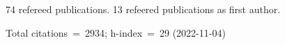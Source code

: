 74 refereed publications. 13 refeered publications as first author.

Total citations~=~2934; h-index~=~29 (2022-11-04)